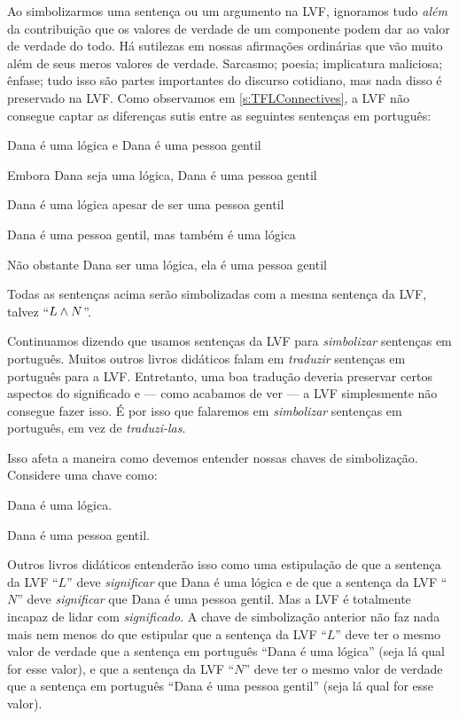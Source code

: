 Ao simbolizarmos uma sentença ou um argumento na LVF, ignoramos tudo \emph{além} da contribuição que os valores de verdade de um componente podem dar ao valor de verdade do todo. Há sutilezas em nossas afirmações ordinárias que vão muito além de seus meros valores de verdade. Sarcasmo; poesia; implicatura maliciosa; ênfase; tudo isso são partes importantes do discurso cotidiano, mas nada disso é preservado na LVF. Como observamos em \cref{s:TFLConnectives}, a LVF não consegue captar as diferenças sutis entre as seguintes sentenças em português:
	\begin{compactlist}
		\item Dana é uma lógica e Dana é uma pessoa gentil
		\item Embora Dana seja uma lógica, Dana é uma pessoa gentil
		\item Dana é uma lógica apesar de ser uma pessoa gentil
		\item Dana é uma pessoa gentil, mas também é uma lógica
		\item Não obstante Dana ser uma lógica, ela é uma pessoa gentil
	\end{compactlist}
Todas as sentenças acima serão simbolizadas com a mesma sentença da LVF, talvez \textquotedblleft{}$L \wedge N$\textquotedblright{}.

Continuamos dizendo que usamos sentenças da LVF para \emph{simbolizar} sentenças em português. Muitos outros livros didáticos falam em \emph{traduzir} sentenças em português para a LVF. Entretanto, uma boa tradução deveria preservar certos aspectos do significado e — como acabamos de ver — a LVF simplesmente não consegue fazer isso. É por isso que falaremos em \emph{simbolizar} sentenças em português, em vez de \emph{traduzi-las}.

Isso afeta a maneira como devemos entender nossas chaves de simbolização. Considere uma chave como:
	\begin{ekey}
		\item[L] Dana é uma lógica.
		\item[N] Dana é uma pessoa gentil.
	\end{ekey}
Outros livros didáticos entenderão isso como uma estipulação de que a sentença da LVF \textquotedblleft{}$L$\textquotedblright{} deve \emph{significar} que Dana é uma lógica e de que a sentença da LVF \textquotedblleft{}$N$\textquotedblright{} deve \emph{significar} que Dana é uma pessoa gentil. Mas a LVF é totalmente incapaz de lidar com \emph{significado}. A chave de simbolização anterior não faz nada mais nem menos do que estipular que a sentença da LVF \textquotedblleft{}$L$\textquotedblright{} deve ter o mesmo valor de verdade que a sentença em português \textquotedblleft{}Dana é uma lógica\textquotedblright{} (seja lá qual for esse valor), e que a sentença da LVF \textquotedblleft{}$N$\textquotedblright{} deve ter o mesmo valor de verdade que a sentença em português \textquotedblleft{}Dana é uma pessoa gentil\textquotedblright{} (seja lá qual for esse valor).


